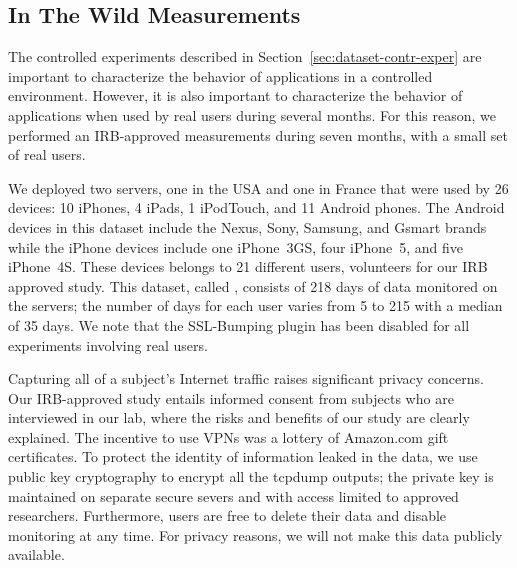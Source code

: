 
\subsection{In The Wild Measurements}
\label{sec:dataset-wild-measurements}

The controlled experiments described in
Section~\ref{sec:dataset-contr-exper} are important to characterize
the behavior of applications in a controlled environment. However, it
is also important to characterize the behavior of applications when
used by real users during several months. For this reason, we
performed an IRB-approved measurements during seven months,  with a small set of real users.

We deployed two \platname servers, one in the USA and one in France
that were used by 26 devices: 10 iPhones, 4 iPads, 1 iPodTouch, and 11
Android phones.  The Android devices in this dataset include the
Nexus, Sony, Samsung, and Gsmart brands while the iPhone devices
include one iPhone~3GS, four iPhone~5, and five iPhone~4S.  These
devices belongs to 21 different users, volunteers for our IRB approved
study.  This dataset, called \mobWild, consists of 218 days of data
monitored on the \platname{} servers; the number of days for each user
varies from 5 to 215 with a median of 35 days.  We note that the
SSL-Bumping plugin has been disabled for all experiments involving
real users.

Capturing all of a subject's Internet traffic raises significant
privacy concerns.  Our IRB-approved study entails informed consent
from subjects who are interviewed in our lab, where the risks and
benefits of our study are clearly explained.  The incentive to use
VPNs was a lottery of Amazon.com gift certificates. To protect the
identity of information leaked in the data, we use public key
cryptography to encrypt all the tcpdump outputs; the private key is
maintained on separate secure severs and with access limited to
approved researchers.  Furthermore, users are free to delete their
data and disable monitoring at any time.  For privacy reasons, we will
not make this data publicly available.




